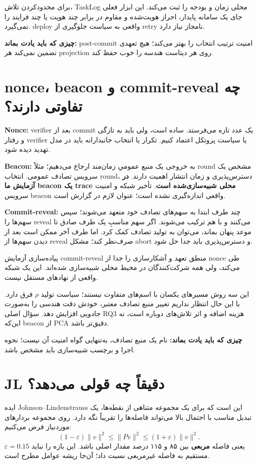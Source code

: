 \documentclass[11pt,a4paper]{article}
\newcommand{\lesson}[1]{\clearpage\section{#1}}
\newcommand{\takeaway}[1]{\par\textbf{چیزی که باید یادت بماند:} #1\par}
\begin{document}
برای محدودکردن تلاش، TaskLog محلی زمان و بودجه را ثبت می‌کند. این ابزار فعلی جای یک سامانه پایدار، احراز هویت‌شده و مقاوم در برابر چند هویت یا چند فرایند را نمی‌گیرد. deploy واقعی به سیاست جلوگیری از retry نامجاز نیاز دارد.

\takeaway{post-commit امنیت ترتیب انتخاب را بهتر می‌کند؛ هیچ تعهدی تضمین نمی‌کند هر projection روی هر دیتاست هندسه را خوب حفظ کند.}

\lesson{nonce، beacon و commit-reveal چه تفاوتی دارند؟}
\textbf{Nonce:} verifier بعد از commit یک عدد تازه می‌فرستد. ساده است، ولی باید به تازگی و رفتار verifier یا سیاست پروتکل اعتماد کنیم. تکرار یا انتخاب جانبدارانه باید در مدل تهدید دیده شود.

\textbf{Beacon:} به خروجی یک منبع عمومیِ زمان‌مند ارجاع می‌دهیم؛ مثلاً round مشخص یک سرویس تصادف عمومی. انتخاب round، دسترس‌پذیری و زمان انتشار اهمیت دارند. \textbf{در آزمایش ما beacon یک trace محلی شبیه‌سازی‌شده است}. تأخیر شبکه و امنیت سرویس beacon واقعی اندازه‌گیری نشده است؛ عنوان لازم در گزارش  است.

\textbf{Commit-reveal:} چند طرف ابتدا به سهم‌های تصادف خود متعهد می‌شوند؛ سپس سهم‌ها را reveal می‌کنند و با هم ترکیب می‌شوند. اگر سهم مناسبِ یک طرف صادق تا موعد پنهان بماند، می‌توان به تولید تصادف کمک کرد. اما طرف آخر ممکن است بعد از دیدن سهم‌ها از reveal صرف‌نظر کند؛ مشکل abort و دسترس‌پذیری باید جدا حل شود.

پیاده‌سازی آزمایش commit-reveal منطق تعهد و آشکارسازی را جدا از nonce طی می‌کند، ولی همه شرکت‌کنندگان در محیط محلی شبیه‌سازی شده‌اند. این یک شبکه واقعی از نهادهای مستقل نیست.

این سه روش مسیرهای یکسان با اسم‌های متفاوت نیستند؛ سیاست تولید \(\rho\) فرق دارد. با این حال انتظار نداریم تغییر منبع تصادف معتبر، خودش دقت هندسی را به‌صورت جادویی افزایش دهد. سؤال اصلی RQ3 هزینه اضافه و اثر تلاش‌های دوباره است، نه این‌که beacon از PCA دقیق‌تر باشد.

\takeaway{نام یک منبع تصادف، به‌تنهایی گواه امنیت آن نیست؛ نحوه اجرا و برچسب شبیه‌سازی باید مشخص باشد.}

\lesson{JL دقیقاً چه قولی می‌دهد؟}
ایده Johnson--Lindenstrauss این است که برای یک مجموعه متناهی از نقطه‌ها، یک تبدیل مناسب با احتمال بالا می‌تواند فاصله‌ها را تقریباً نگه دارد. روی مجموعه بردارهای موردنیاز فرض می‌کنیم:
\[
 (1-\varepsilon)\|v\|^2\le\|Pv\|^2
 \le(1+\varepsilon)\|v\|^2.
\]
\(\varepsilon=0.15\) یعنی فاصله \textbf{مربعی} بین ۸۵ و ۱۱۵ درصد مقدار اصلی باشد. این بازه را نباید مستقیم به فاصله غیرمربعی نسبت داد؛ آن‌جا ریشه عوامل مطرح است.
\end{document}
